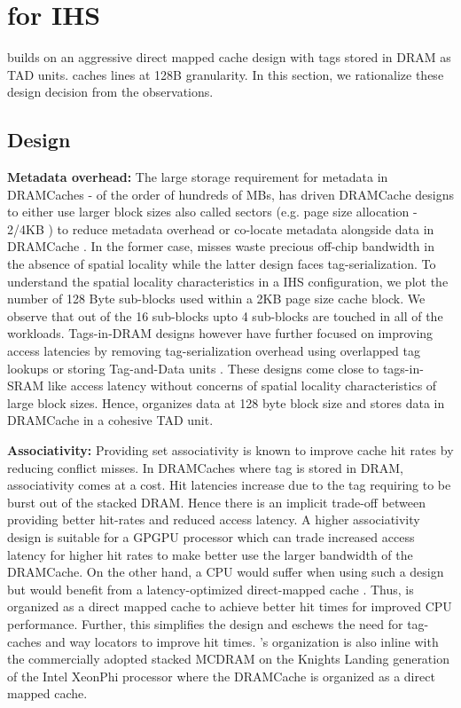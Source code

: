 \section{\cachename for IHS} \label{design}

\cachename builds on an aggressive direct mapped cache design with tags stored in DRAM as TAD units. \cachename caches lines at 128B granularity. In this section, we rationalize these design decision from the observations.

\subsection{\cachename Design} \label{design}

\par \textbf{Metadata overhead:} The large storage requirement for metadata in DRAMCaches - of the order of hundreds of MBs, has driven DRAMCache designs to either use larger block sizes also called sectors (e.g. page size allocation - 2/4KB \cite{footprint,unison-cache}) to reduce metadata overhead or co-locate metadata alongside data in DRAMCache \cite{loh-hill,alloy,atcache}. In the former case, misses waste precious off-chip bandwidth in the absence of spatial locality while the latter design faces tag-serialization. To understand the spatial locality characteristics in a IHS configuration, we plot the number of 128 Byte sub-blocks used within a 2KB page size cache block. We observe that out of the 16 sub-blocks upto 4 sub-blocks are touched in all of the workloads. 
Tags-in-DRAM designs however have further focused on improving access latencies by removing tag-serialization overhead using overlapped tag lookups \cite{loh-hill} or storing Tag-and-Data units \cite{alloy}. These designs come close to tags-in-SRAM like access latency without concerns of spatial locality characteristics of large block sizes. Hence, \cachename organizes data at 128 byte block size and stores data in DRAMCache in a cohesive TAD unit.

\par \textbf{Associativity:} Providing set associativity is known to improve cache hit rates by reducing conflict misses. In DRAMCaches where tag is stored in DRAM,  associativity comes at a cost. Hit latencies increase due to the tag requiring to be burst out of the stacked DRAM. Hence there is an implicit trade-off between providing better hit-rates and reduced access latency. A higher associativity design is suitable for a GPGPU processor which can trade increased access latency for higher hit rates to make better use the larger bandwidth of the DRAMCache. On the other hand, a CPU would suffer when using such a design but would benefit from a latency-optimized direct-mapped cache \cite{alloy}. Thus, \cachename is organized as a direct mapped cache to achieve better hit times for improved CPU performance. Further, this simplifies the design and eschews the need for tag-caches \cite{atcache} and way locators \cite{bimodal} to improve hit times. \cachename's organization is also inline with the commercially adopted stacked MCDRAM on the Knights Landing generation of the Intel XeonPhi processor \cite{xeonphi} where the DRAMCache is organized as a direct mapped cache.

